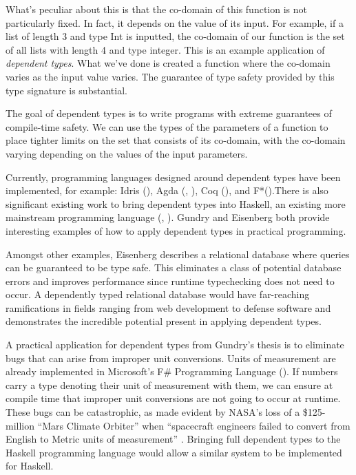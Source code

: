 What's peculiar about this is that the co-domain of this function is not
particularly fixed. In fact, it depends on the value of its input. For example,
if a list of length 3 and type Int is inputted, the co-domain of our function is
the set of all lists with length 4 and type integer. This is an
example application of \textit{dependent types}. What we've done is created
a function where the co-domain varies as the input value varies. The guarantee
of type safety provided by this type signature is substantial. 

The goal of dependent types is to write programs with extreme guarantees of
compile-time safety. We can use the types of the parameters of a function to
place tighter limits on the set that consists of its co-domain, with the
co-domain varying depending on the values of the input parameters. 

Currently, programming languages designed around dependent types have been
implemented, for example: Idris (\cite{idris_systems_programming}), Agda
(\cite{agda1}, \cite{agda2}), Coq (\cite{coq1}), and
F*(\cite{fstardependent2016}).There is also significant existing work to bring
dependent types into Haskell, an existing more mainstream programming language
(\cite{eisenberg2016}, \cite{gundry2013}). Gundry and Eisenberg both provide
interesting examples of how to apply dependent types in practical programming.

Amongst other examples, Eisenberg describes a relational database where queries
can be guaranteed to be type safe. This eliminates a class of potential database
errors and improves performance since runtime typechecking does not need to
occur. A dependently typed relational database would have far-reaching
ramifications in fields ranging from web development to defense software and
demonstrates the incredible potential present in applying dependent types. 

A practical application for dependent types from Gundry's thesis is to eliminate
bugs that can arise from improper unit conversions. Units of measurement are 
already implemented in Microsoft's F\# Programming Language (\cite{kennedy2009}).
If numbers carry a type denoting their unit of measurement with them, we can
ensure at compile time that improper unit conversions are not going to occur at
runtime. These bugs can be catastrophic, as made evident by NASA's loss of a
\$125-million ``Mars Climate Orbiter'' when ``spacecraft engineers failed to 
convert from English to Metric units of measurement'' \cite{hotz1999}. Bringing 
full dependent types to the Haskell programming language would allow a similar
system to be implemented for Haskell. 

